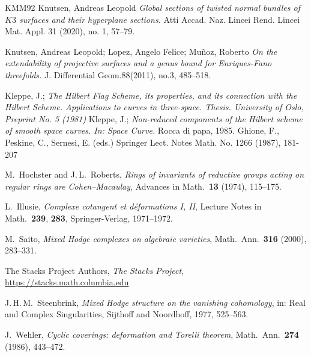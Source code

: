 \documentclass[11pt,twoside]{amsart}
\theoremstyle{plain}
\numberwithin{equation}{section}
\theoremstyle{definition}
\begin{document}
\begin{thebibliography}{KMM92}
Knutsen, Andreas Leopold
\emph{Global sections of twisted normal bundles of $K3$ surfaces and their hyperplane sections.}
Atti Accad. Naz. Lincei Rend. Lincei Mat. Appl. 31 (2020), no. 1, 57–79.


Knutsen, Andreas Leopold; Lopez, Angelo Felice; Muñoz, Roberto
\emph{On the extendability of projective surfaces and a genus bound for Enriques-Fano threefolds.}
J. Differential Geom.88(2011), no.3, 485–518.

Kleppe, J.; 
\emph{The Hilbert Flag Scheme, its properties, and its connection with the Hilbert Scheme. Applications to curves in three-space. Thesis. University of Oslo, Preprint No. 5 (1981)}
Kleppe, J.;
\emph{Non-reduced components of the Hilbert scheme of smooth space curves. In: Space Curve.}
Rocca di papa, 1985. Ghione, F., Peskine, C., Sernesi, E. (eds.) Springer Lect. Notes Math. No. 1266 (1987), 181-207

 M.~Hochster and J.\,L.~Roberts, \emph{Rings of invariants of reductive groups acting on regular rings are Cohen--Macaulay}, Advances in Math.\ \textbf{13} (1974), 115--175.
 
 L.~Illusie, \emph{Complexe cotangent et d\'eformations I, II}, Lecture Notes in Math.\ \textbf{239}, \textbf{283}, Springer-Verlag, 1971--1972.
 
 M.~Saito, \emph{Mixed Hodge complexes on algebraic varieties}, Math.\ Ann.\ \textbf{316} (2000), 283--331.

The Stacks Project Authors,
\emph{The Stacks Project},
\url{https://stacks.math.columbia.edu}
 
 J.\,H.\,M.~Steenbrink, \emph{Mixed Hodge structure on the vanishing cohomology}, in: Real and Complex Singularities, Sijthoff and Noordhoff, 1977, 525--563.
 
 J.~Wehler, \emph{Cyclic coverings: deformation and Torelli theorem}, Math.\ Ann.\ \textbf{274} (1986), 443--472.

  













\end{thebibliography}
\end{document}
